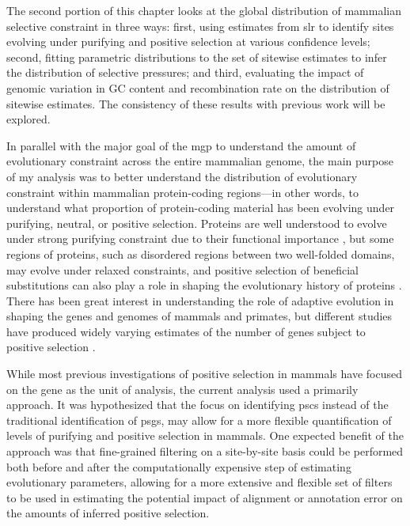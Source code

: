 The second portion of this chapter looks at the global distribution of mammalian
selective constraint in three ways: first, using \sw estimates from
\ac{slr} to identify sites evolving under purifying and positive
selection at various confidence levels; second, fitting parametric
distributions to the set of sitewise estimates to infer the
distribution of selective pressures; and third, evaluating the impact
of genomic variation in GC content and recombination rate on the
distribution of sitewise estimates. The consistency of these results
with previous work will be explored.

In parallel with the major goal of the \ac{mgp} to understand the
amount of evolutionary constraint across the entire mammalian genome,
the main purpose of my analysis was to better understand the
distribution of evolutionary constraint within mammalian
protein-coding regions---in other words, to understand what proportion
of protein-coding material has been evolving under purifying, neutral,
or positive selection. Proteins are well understood to evolve under
strong purifying constraint due to their functional importance
\citep{Fay2003}, but some regions of proteins, such as disordered
regions between two well-folded domains, may evolve under relaxed
constraints, and positive selection of beneficial substitutions can
also play a role in shaping the evolutionary history of proteins
\citep{Pal2006}. There has been great interest in understanding the
role of adaptive evolution in shaping the genes and genomes of mammals
and primates, but different studies have produced widely varying
estimates of the number of genes subject to positive selection
\citep{MarquesBonet2009a,Ellegren2008}.

While most previous investigations of positive selection in mammals
have focused on the gene as the unit of analysis, the current analysis
used a primarily \sw approach. It was hypothesized that the focus on
identifying \acp{psc} instead of the traditional identification of
\acp{psg}, may allow for a more flexible quantification of levels of
purifying and positive selection in mammals. One expected benefit of
the \sw approach was that fine-grained filtering on a site-by-site
basis could be performed both before and after the computationally
expensive step of estimating evolutionary parameters, allowing for a
more extensive and flexible set of filters to be used in estimating
the potential impact of alignment or annotation error on the amounts
of inferred positive selection.

